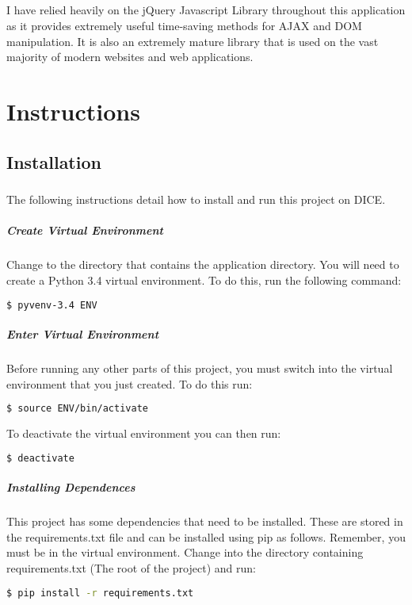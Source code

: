 \documentclass[10pt]{report}
\begin{document}
    \paragraph{}
    I have relied heavily on the jQuery Javascript Library throughout this application as it provides
    extremely useful time-saving methods for AJAX and DOM manipulation.  It is also an extremely mature
    library that is used on the vast majority of modern websites and web applications.
    
    \chapter*{Instructions}
    \section*{Installation}
    \paragraph{}
    The following instructions detail how to install and run this project on DICE.
    
    \paragraph{Create Virtual Environment}
    Change to the directory that contains the application directory.  You will need to create a Python 3.4
    virtual environment.  To do this, run the following command:
    \begin{lstlisting}[language=bash]
    	$ pyvenv-3.4 ENV
    \end{lstlisting}
    
    \paragraph{Enter Virtual Environment}
    Before running any other parts of this project, you must switch into the virtual environment that you
    just created.  To do this run:
    \begin{lstlisting}[language=bash]
    	$ source ENV/bin/activate
    \end{lstlisting}
    To deactivate the virtual environment you can then run:
    \begin{lstlisting}[language=bash]
    	$ deactivate
    \end{lstlisting}
    
    \paragraph{Installing Dependences}
    This project has some dependencies that need to be installed.  These are stored in the 
    requirements.txt file and can be installed using pip as follows.  Remember, you must be in the virtual
    environment.  Change into the directory containing requirements.txt (The root of the project) and run:
    \begin{lstlisting}[language=bash]
    	$ pip install -r requirements.txt
    \end{lstlisting}
    
\end{document}
